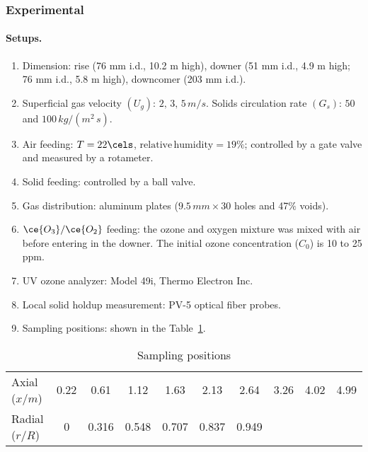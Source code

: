 \subsubsection{Experimental}
\paragraph{Setups. }
\begin{enumerate}
    \item Dimension: rise (76 mm i.d., 10.2 m high), 
    downer (51 mm i.d., 4.9 m high; 76 mm i.d., 5.8 m high), 
    downcomer (203 mm i.d.). 

    \item Superficial gas velocity $(U_g)$: $2,\,3,\,5\,\si{m/s}$. 
    Solids circulation rate $(G_s)$: $50$ and $100\,\si{kg/(m^2\,s)}$.
    
    \item Air feeding: $T = 22 \cels$, $\mathrm{relative\, humidity} = 19\%$; 
    controlled by a gate valve and measured by a rotameter.
    
    \item Solid feeding: controlled by a ball valve.
    
    \item Gas distribution: aluminum plates ($9.5\,\si{mm}\times 30$ holes and 47$\%$ voids).
    
    \item $\ce{O_3} / \ce{O_2}$ feeding: the ozone and oxygen mixture was mixed with air before entering in the downer. 
    The initial ozone concentration ($C_0$) is 10 to 25 ppm.
    
    \item UV ozone analyzer: Model 49i, Thermo Electron Inc.
    
    \item Local solid holdup measurement: PV-5 optical fiber probes.
    
    \item Sampling positions: shown in the Table~\ref{tab: sampling positions}.
\end{enumerate}

\begin{table}[!h]
    \small
    \flushright
    \caption{Sampling positions}
    \label{tab: sampling positions}
    \begin{tabular}{lccccccccc}
        \toprule
        Axial ($x/\si{m}$) & 0.22 & 0.61 & 1.12 & 1.63 & 2.13 & 2.64 & 3.26 & 4.02 & 4.99 \\
        Radial ($r/R$) & 0 & 0.316 & 0.548 & 0.707 & 0.837 & 0.949 & & &  \\
        \bottomrule
    \end{tabular}
\end{table}


